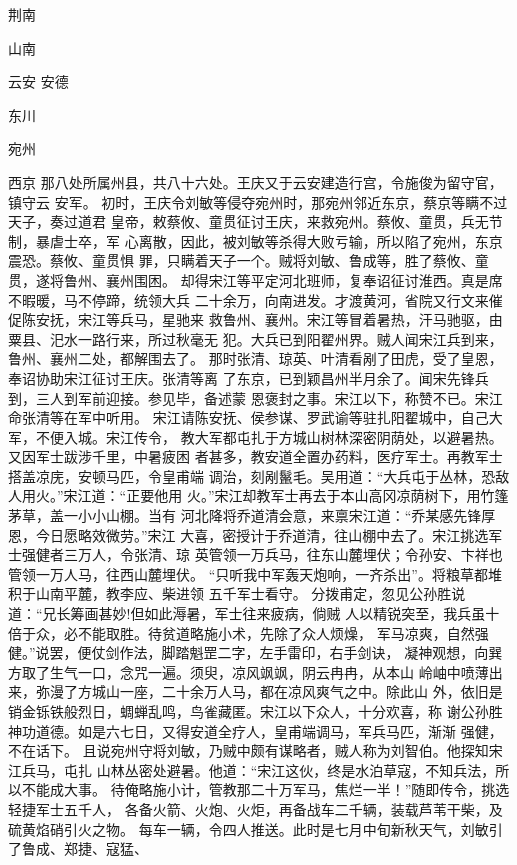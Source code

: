 荆南

山南

云安
安德

东川

宛州

西京
那八处所属州县，共八十六处。王庆又于云安建造行宫，令施俊为留守官，镇守云
安军。
初时，王庆令刘敏等侵夺宛州时，那宛州邻近东京，蔡京等瞒不过天子，奏过道君
皇帝，敕蔡攸、童贯征讨王庆，来救宛州。蔡攸、童贯，兵无节制，暴虐士卒，军
心离散，因此，被刘敏等杀得大败亏输，所以陷了宛州，东京震恐。蔡攸、童贯惧
罪，只瞒着天子一个。贼将刘敏、鲁成等，胜了蔡攸、童贯，遂将鲁州、襄州围困。
却得宋江等平定河北班师，复奉诏征讨淮西。真是席不暇暖，马不停蹄，统领大兵
二十余万，向南进发。才渡黄河，省院又行文来催促陈安抚，宋江等兵马，星驰来
救鲁州、襄州。宋江等冒着暑热，汗马驰驱，由粟县、汜水一路行来，所过秋毫无
犯。大兵已到阳翟州界。贼人闻宋江兵到来，鲁州、襄州二处，都解围去了。
那时张清、琼英、叶清看剐了田虎，受了皇恩，奉诏协助宋江征讨王庆。张清等离
了东京，已到颖昌州半月余了。闻宋先锋兵到，三人到军前迎接。参见毕，备述蒙
恩褒封之事。宋江以下，称赞不已。宋江命张清等在军中听用。
宋江请陈安抚、侯参谋、罗武谕等驻扎阳翟城中，自己大军，不便入城。宋江传令，
教大军都屯扎于方城山树林深密阴荫处，以避暑热。又因军士跋涉千里，中暑疲困
者甚多，教安道全置办药料，医疗军士。再教军士搭盖凉庑，安顿马匹，令皇甫端
调治，刻剐鬣毛。吴用道：“大兵屯于丛林，恐敌人用火。”宋江道：“正要他用
火。”宋江却教军士再去于本山高冈凉荫树下，用竹篷茅草，盖一小小山棚。当有
河北降将乔道清会意，来禀宋江道：“乔某感先锋厚恩，今日愿略效微劳。”宋江
大喜，密授计于乔道清，往山棚中去了。宋江挑选军士强健者三万人，令张清、琼
英管领一万兵马，往东山麓埋伏；令孙安、卞祥也管领一万人马，往西山麓埋伏。
“只听我中军轰天炮响，一齐杀出”。将粮草都堆积于山南平麓，教李应、柴进领
五千军士看守。
分拨甫定，忽见公孙胜说道：“兄长筹画甚妙!但如此溽暑，军士往来疲病，倘贼
人以精锐突至，我兵虽十倍于众，必不能取胜。待贫道略施小术，先除了众人烦燥，
军马凉爽，自然强健。”说罢，便仗剑作法，脚踏魁罡二字，左手雷印，右手剑诀，
凝神观想，向巽方取了生气一口，念咒一遍。须臾，凉风飒飒，阴云冉冉，从本山
岭岫中喷薄出来，弥漫了方城山一座，二十余万人马，都在凉风爽气之中。除此山
外，依旧是销金铄铁般烈日，蜩蝉乱鸣，鸟雀藏匿。宋江以下众人，十分欢喜，称
谢公孙胜神功道德。如是六七日，又得安道全疗人，皇甫端调马，军兵马匹，渐渐
强健，不在话下。
且说宛州守将刘敏，乃贼中颇有谋略者，贼人称为刘智伯。他探知宋江兵马，屯扎
山林丛密处避暑。他道：“宋江这伙，终是水泊草寇，不知兵法，所以不能成大事。
待俺略施小计，管教那二十万军马，焦烂一半！”随即传令，挑选轻捷军士五千人，
各备火箭、火炮、火炬，再备战车二千辆，装载芦苇干柴，及硫黄焰硝引火之物。
每车一辆，令四人推送。此时是七月中旬新秋天气，刘敏引了鲁成、郑捷、寇猛、
